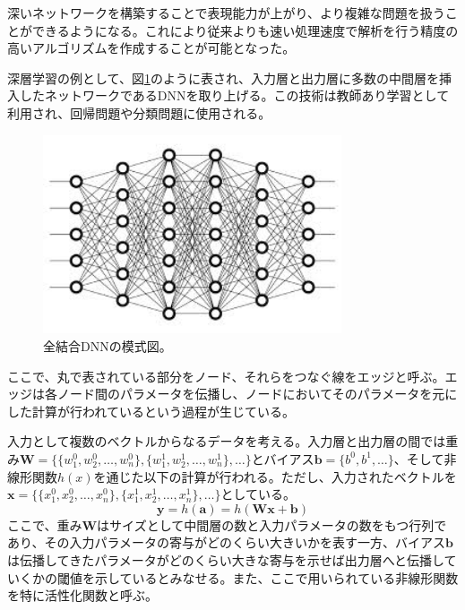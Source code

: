 深いネットワークを構築することで表現能力が上がり、より複雑な問題を扱うことができるようになる。これにより従来よりも速い処理速度で解析を行う精度の高いアルゴリズムを作成することが可能となった。

深層学習の例として、図\ref{DNN}のように表され、入力層と出力層に多数の中間層を挿入したネットワークであるDNNを取り上げる。この技術は教師あり学習として利用され、回帰問題や分類問題に使用される。

\begin{figure}[h]
	\begin{center}
		\includegraphics[width=250pt]{./Figure/DeepLearning/dl.jpeg}
		\caption[全結合DNNの模式図]{全結合DNNの模式図。}
		\label{DNN}
	\end{center}
\end{figure}


ここで、丸で表されている部分をノード、それらをつなぐ線をエッジと呼ぶ。エッジは各ノード間のパラメータを伝播し、ノードにおいてそのパラメータを元にした計算が行われているという過程が生じている。

入力として複数のベクトルからなるデータを考える。入力層と出力層の間では重み$\textbf{W}=\{\{w^0_1, w^0_2,\ldots, w_n^0\},\{w_1^1,w_2^1,\ldots ,w_n^1\},\ldots\}$とバイアス$\textbf{b}=\{b^0,b^1,\ldots\}$、そして非線形関数$h(x)$を通じた以下の計算が行われる。ただし、入力されたベクトルを$\textbf{x} = \{\{x^0_1, x^0_2,\ldots, x_n^0\},\{x_1^1,x_2^1,\ldots ,x_n^1\},\ldots\}$としている。
\begin{equation}
\textbf{y}  = h(\textbf{a}) = h(\textbf{Wx} +\textbf{b})
\end{equation}
ここで、重み$\textbf{W}$はサイズとして中間層の数と入力パラメータの数をもつ行列であり、その入力パラメータの寄与がどのくらい大きいかを表す一方、バイアス$\textbf{b}$は伝播してきたパラメータがどのくらい大きな寄与を示せば出力層へと伝播していくかの閾値を示しているとみなせる。また、ここで用いられている非線形関数を特に活性化関数と呼ぶ。

